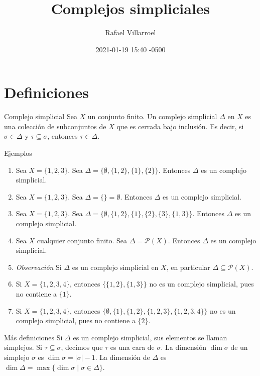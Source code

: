 \documentclass[spanish, presentation]{beamer}
\author{Rafael Villarroel}
\date{2021-01-19 15:40 -0500}
\title{Complejos simpliciales}
\begin{document}
\maketitle
{}

\section{Definiciones}
\label{sec:org6337d37}

\begin{frame}[label={sec:org2faa18a}]{Complejo simplicial}
Sea \(X\) un conjunto finito. Un \alert{complejo simplicial} \(\Delta\) en \(X\) es una colección de subconjuntos de \(X\) que es cerrada bajo inclusión. Es decir, si \(\sigma\in\Delta\) y \(\tau\subseteq\sigma\), entonces \(\tau\in\Delta\).
\end{frame}

\begin{frame}[label={sec:orga057b6e}]{Ejemplos}
\begin{enumerate}
\item Sea \(X=\{1,2,3\}\). Sea \(\Delta=\{\emptyset,\{1,2\},\{1\},\{2\}\}\). Entonces \(\Delta\) es un complejo simplicial.
\item Sea \(X=\{1,2,3\}\). Sea \(\Delta=\{\}=\emptyset\). Entonces \(\Delta\) es un complejo simplicial.
\item Sea \(X=\{1,2,3\}\). Sea \(\Delta=\{\emptyset,\{1,2\},\{1\},\{2\},\{3\},\{1,3\}\}\). Entonces \(\Delta\) es un complejo simplicial.
\item Sea \(X\) cualquier conjunto finito. Sea \(\Delta=\mathcal{P}(X)\). Entonces \(\Delta\) es un complejo simplicial.
\item \emph{Observación} Si \(\Delta\) es un complejo simplicial en \(X\), en particular \(\Delta\subseteq \mathcal{P}(X)\).
\item Si \(X=\{1,2,3,4\}\), entonces \(\{\{1,2\},\{1,3\}\}\) no es un complejo simplicial, pues no contiene a \(\{1\}\).
\item Si \(X=\{1,2,3,4\}\), entonces \(\{\emptyset,\{1\},\{1,2\},\{1,2,3\},\{1,2,3,4\}\}\) no es un complejo simplicial, pues no contiene a \(\{2\}\).
\end{enumerate}
\end{frame}

\begin{frame}[label={sec:org8bfa386}]{Más definiciones}
Si \(\Delta\) es un complejo simplicial, sus elementos se llaman \alert{simplejos}. Si \(\tau\subseteq\sigma\), decimos que \(\tau\) es una \alert{cara} de \(\sigma\). La \alert{dimensión} \(\dim\sigma\) de un simplejo \(\sigma\) es \(\dim\sigma=|\sigma|-1\). La dimensión de \(\Delta\) es \(\dim\Delta=\max\{\dim\sigma\mid \sigma\in\Delta\}\). 
\end{frame}
\end{document}
